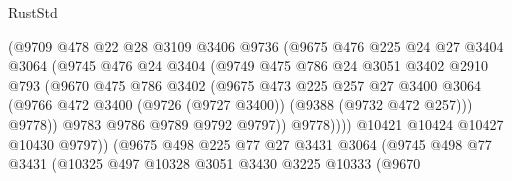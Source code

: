 \begin{lexlean}{RustStd}
\begin{coremodule}
                          (@9709
                            @478
                            @22
                            @28
                            @3109
                            @3406
                            @9736
                            (@9675
                              @476
                              @225
                              @24
                              @27
                              @3404
                              @3064
                              (@9745
                                @476
                                @24
                                @3404
                                (@9749
                                  @475
                                  @786
                                  @24
                                  @3051
                                  @3402
                                  @2910
                                  @793
                                  (@9670
                                    @475
                                    @786
                                    @3402
                                    (@9675
                                      @473
                                      @225
                                      @257
                                      @27
                                      @3400
                                      @3064
                                      (@9766
                                        @472
                                        @3400
                                        (@9726 (@9727 @3400))
                                        (@9388 (@9732 @472 @257)))
                                      @9778))
                                  @9783
                                  @9786
                                  @9789
                                  @9792
                                  @9797))
                              @9778))))
                      @10421
                      @10424
                      @10427
                      @10430
                      @9797))
                  (@9675
                    @498
                    @225
                    @77
                    @27
                    @3431
                    @3064
                    (@9745
                      @498
                      @77
                      @3431
                      (@10325
                        @497
                        @10328
                        @3051
                        @3430
                        @3225
                        @10333
                        (@9670

\end{coremodule}
\end{lexlean}
